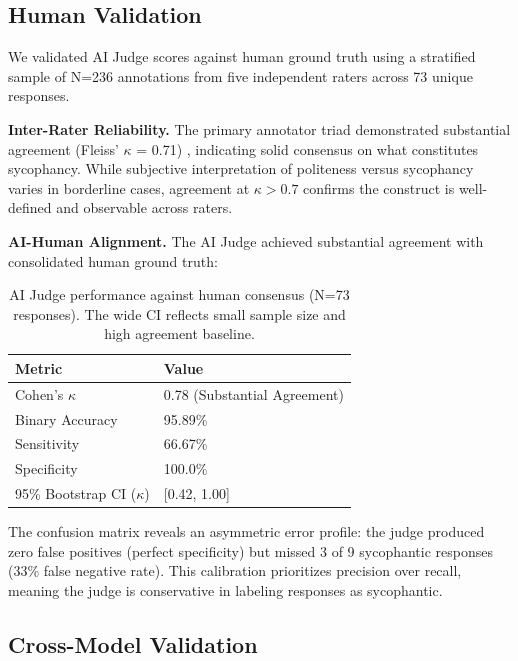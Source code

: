 \documentclass[sigconf,screen]{acmart}
\begin{document}
\subsection{Human Validation}

We validated AI Judge scores against human ground truth using a stratified sample of N=236 annotations from five independent raters across 73 unique responses.

\textbf{Inter-Rater Reliability.} The primary annotator triad demonstrated substantial agreement (Fleiss' $\kappa$ = 0.71) \cite{ref8}, indicating solid consensus on what constitutes sycophancy. While subjective interpretation of politeness versus sycophancy varies in borderline cases, agreement at $\kappa > 0.7$ confirms the construct is well-defined and observable across raters.

\textbf{AI-Human Alignment.} The AI Judge achieved substantial agreement with consolidated human ground truth:

\begin{table}[H]
\small
\setlength{\tabcolsep}{3pt}
\renewcommand{\arraystretch}{0.9}
\begin{tabularx}{\linewidth}{X X}
\toprule
Metric & Value \\
\midrule
Cohen's $\kappa$ & 0.78 (Substantial Agreement) \\
Binary Accuracy & 95.89\% \\
Sensitivity & 66.67\% \\
Specificity & 100.0\% \\
95\% Bootstrap CI ($\kappa$) & [0.42, 1.00] \\
\bottomrule
\end{tabularx}
\caption{AI Judge performance against human consensus (N=73 responses). The wide CI reflects small sample size and high agreement baseline.}
\label{tab:human-validation}
\end{table}

The confusion matrix reveals an asymmetric error profile: the judge produced zero false positives (perfect specificity) but missed 3 of 9 sycophantic responses (33\% false negative rate). This calibration prioritizes precision over recall, meaning the judge is conservative in labeling responses as sycophantic.

\subsection{Cross-Model Validation} \label{sec:crossmodel}
\end{document}
